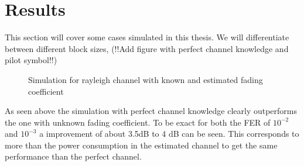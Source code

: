 \section{Results}
This section will cover some cases simulated in this thesis. We will differentiate between different block sizes,
(!!Add figure with perfect channel knowledge and pilot symbol!!)

\begin{figure}[!htb]
	\setlength{}
	\setlength\fheight{0.4\textheight}
	\centering
		
	\caption{Simulation for rayleigh channel with known and estimated fading coefficient}
	\label{fig:rayferfirst}
\end{figure}

As seen above the simulation with perfect channel knowledge clearly outperforms the one with unknown fading coefficient. To be exact for both the \gls{FER} of $10^{-2}$ and $10^{-3}$ a improvement of about 3.5dB to 4 dB can be seen. This corresponds to more than the power consumption in the estimated channel to get the same performance than the perfect channel.

